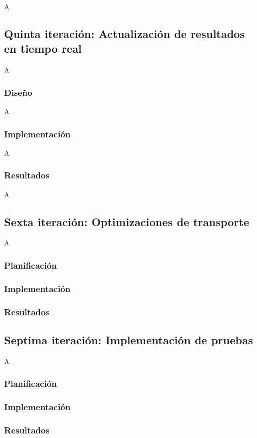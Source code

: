 A

\subsection{Quinta iteración: Actualización de resultados en tiempo real}

A

\subsubsection*{Diseño}

A

\subsubsection*{Implementación}

A

\subsubsection*{Resultados}

A

\subsection{Sexta iteración: Optimizaciones de transporte}

A

\subsubsection*{Planificación}

\subsubsection*{Implementación}

\subsubsection*{Resultados}



\subsection{Septima iteración: Implementación de pruebas}

A

\subsubsection*{Planificación}

\subsubsection*{Implementación}

\subsubsection*{Resultados}


